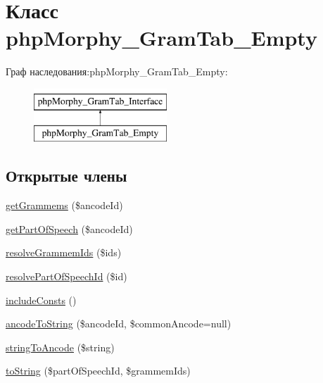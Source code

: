 \hypertarget{classphpMorphy__GramTab__Empty}{
\section{Класс phpMorphy\_\-GramTab\_\-Empty}
\label{classphpMorphy__GramTab__Empty}
}
Граф наследования:phpMorphy\_\-GramTab\_\-Empty:\begin{figure}[H]
\begin{center}
\leavevmode
\includegraphics[height=2.000000cm]{classphpMorphy__GramTab__Empty}
\end{center}
\end{figure}
\subsection*{Открытые члены}
\begin{DoxyCompactItemize}
\item 
\hyperlink{classphpMorphy__GramTab__Empty_afd64f973aa1e73f265577559e9c9b550}{getGrammems} (\$ancodeId)
\item 
\hyperlink{classphpMorphy__GramTab__Empty_ad5980f6995a96501d197fc97de134957}{getPartOfSpeech} (\$ancodeId)
\item 
\hyperlink{classphpMorphy__GramTab__Empty_a6e094499582c3ae898b63afcf046dab1}{resolveGrammemIds} (\$ids)
\item 
\hyperlink{classphpMorphy__GramTab__Empty_a069a13461cacb5eb3fd8984db8b56659}{resolvePartOfSpeechId} (\$id)
\item 
\hyperlink{classphpMorphy__GramTab__Empty_a465275b298d9cd4b98b828e41f233016}{includeConsts} ()
\item 
\hyperlink{classphpMorphy__GramTab__Empty_a57a386810e88f3fdd376d6756a5d1947}{ancodeToString} (\$ancodeId, \$commonAncode=null)
\item 
\hyperlink{classphpMorphy__GramTab__Empty_aa2288b9b200ad168277c039ae40c9de4}{stringToAncode} (\$string)
\item 
\hyperlink{classphpMorphy__GramTab__Empty_a4e3838d74b26a292d813000037b644f8}{toString} (\$partOfSpeechId, \$grammemIds)
\end{DoxyCompactItemize}


